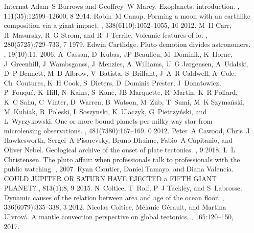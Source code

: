 \documentclass[letterpaper,10pt,english]{jupyterBook}
\begin{document}
\begin{sphinxthebibliography}{Internat}
\sphinxAtStartPar
Adam S Burrows and Geoffrey W Marcy. Exoplanets. introduction. , 111(35):12599–12600, 8 2014.
\sphinxAtStartPar
Robin M Canup. Forming a moon with an earth\sphinxhyphen{}like composition via a giant impact. , 338(6110):1052–1055, 10 2012.
\sphinxAtStartPar
M H Carr, H Masursky, R G Strom, and R J Terrile. Volcanic features of io. , 280(5725):729–733, 7 1979.
\sphinxAtStartPar
Edwin Cartlidge. Pluto demotion divides astronomers. , 19(10):11, 2006.
\sphinxAtStartPar
A Cassan, D Kubas, J\sphinxhyphen{}P Beaulieu, M Dominik, K Horne, J Greenhill, J Wambsganss, J Menzies, A Williams, U G Jørgensen, A Udalski, D P Bennett, M D Albrow, V Batista, S Brillant, J A R Caldwell, A Cole, Ch Coutures, K H Cook, S Dieters, D Dominis Prester, J Donatowicz, P Fouqué, K Hill, N Kains, S Kane, J\sphinxhyphen{}B Marquette, R Martin, K R Pollard, K C Sahu, C Vinter, D Warren, B Watson, M Zub, T Sumi, M K Szymański, M Kubiak, R Poleski, I Soszynski, K Ulaczyk, G Pietrzyński, and L Wyrzykowski. One or more bound planets per milky way star from microlensing observations. , 481(7380):167–169, 0 2012.
\sphinxAtStartPar
Peter A Cawood, Chris J Hawkesworth, Sergei A Pisarevsky, Bruno Dhuime, Fabio A Capitanio, and Oliver Nebel. Geological archive of the onset of plate tectonics. , 9 2018.
\sphinxAtStartPar
L L Christensen. The pluto affair: when professionals talk to professionals with the public watching. , 2007.
\sphinxAtStartPar
Ryan Cloutier, Daniel Tamayo, and Diana Valencia. COULD JUPITER OR SATURN HAVE EJECTED a FIFTH GIANT PLANET? , 813(1):8, 9 2015.
\sphinxAtStartPar
N Coltice, T Rolf, P J Tackley, and S Labrosse. Dynamic causes of the relation between area and age of the ocean floor. , 336(6079):335–338, 3 2012.
\sphinxAtStartPar
Nicolas Coltice, Mélanie Gérault, and Martina Ulvrová. A mantle convection perspective on global tectonics. , 165:120–150, 2017.

\end{sphinxthebibliography}
\end{document}
